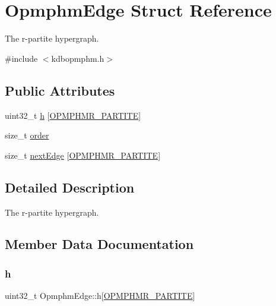 \hypertarget{structOpmphmEdge}{}\section{Opmphm\+Edge Struct Reference}
\label{structOpmphmEdge}


The r-\/partite hypergraph.  




{\ttfamily \#include $<$kdbopmphm.\+h$>$}

\subsection*{Public Attributes}
\begin{DoxyCompactItemize}
\item 
uint32\+\_\+t \hyperlink{structOpmphmEdge_ae69c2e8fea917bc9f1b3ec7fecc3dd2a}{h} \mbox{[}\hyperlink{kdbopmphm_8h_ad241eace4050c6fcdab0da1919a79d93}{O\+P\+M\+P\+H\+M\+R\+\_\+\+P\+A\+R\+T\+I\+TE}\mbox{]}
\item 
size\+\_\+t \hyperlink{structOpmphmEdge_a6e4538c7c7f5d72f8ecab6aca834e8c8}{order}
\item 
size\+\_\+t \hyperlink{structOpmphmEdge_add7672f7932f5e829a2228dc0d87606e}{next\+Edge} \mbox{[}\hyperlink{kdbopmphm_8h_ad241eace4050c6fcdab0da1919a79d93}{O\+P\+M\+P\+H\+M\+R\+\_\+\+P\+A\+R\+T\+I\+TE}\mbox{]}
\end{DoxyCompactItemize}


\subsection{Detailed Description}
The r-\/partite hypergraph. 

\subsection{Member Data Documentation}
\mbox{\label{structOpmphmEdge_ae69c2e8fea917bc9f1b3ec7fecc3dd2a}} 
\subsubsection{\texorpdfstring{h}{h}}
{\footnotesize\ttfamily uint32\+\_\+t Opmphm\+Edge\+::h\mbox{[}\hyperlink{kdbopmphm_8h_ad241eace4050c6fcdab0da1919a79d93}{O\+P\+M\+P\+H\+M\+R\+\_\+\+P\+A\+R\+T\+I\+TE}\mbox{]}}

